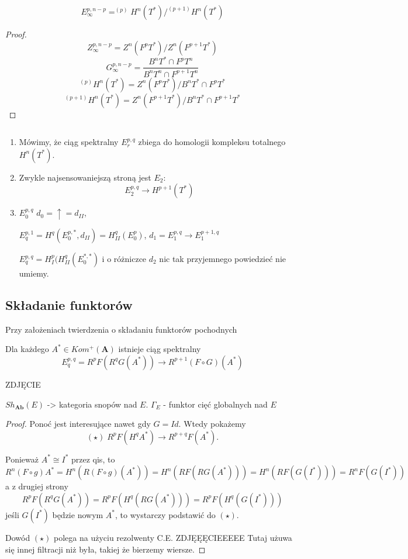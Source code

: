 \begin{fact}
  $$E_\infty^{p,n-p}=^{(p)}H^n(T^*)/^{(p+1)}H^n(T^*)$$
\end{fact}

\begin{proof}
  $$Z_\infty ^{p,n-p}=Z^n(F^pT^*)/Z^n(F^{p+1}T^*)$$
  $$G_\infty^{p, n-p}=\frac{B^nT^*\cap F^pT^n}{B^nT^n\cap F^{p+1}T^n}$$
  $$^{(p)}H^n(T^*)=Z^n(F^pT^*)/B^nT^*\cap F^{p}T^*$$
  $$^{(p+1)}H^n(T^*)=Z^n(F^{p+1}T^*)/B^nT^*\cap F^{p+1}T^*$$
\end{proof}

\begin{uwaga}$ $

  \begin{enumerate}
    \item Mówimy, że ciąg spektralny $E_r^{p,q}$ zbiega do homologii kompleksu totalnego $H^n(T^*)$.
    \item Zwykle najsensowaniejszą stroną jest $E_2$:
      $$E_2^{p,q}\to H^{p+1}(T^*)$$
    \item $E_0^{p,q}$ $d_0=\uparrow=d_{II}$,

      $E_q^{p,1}=H^q(E_0^{p, *}, d_{II})=H_{II}^q(E_0^p)$, $d_1=E_1^{p,q}\to E_1^{p+1, q}$
      
      $E_q^{p,q}=H_I^p(H_{II}^q(E_0^{*,*})$ i o różniczce $d_2$ nic tak przyjemnego powiedzieć nie umiemy.
  \end{enumerate}
\end{uwaga}

\subsection{Składanie funktorów}

\begin{theorem}
  Przy założeniach twierdzenia o składaniu funktorów pochodnych

  Dla każdego $A^*\in Kom^+(\mathbf{A})$ istnieje ciąg spektralny
  $$E_q^{p,q}=R^pF(R^qG(A^*))\to R^{p+1}(F\circ G)(A^*)$$
\end{theorem}

\begin{example}
\item {\large\color{red}ZDJĘCIE}

  $Sh_{\mathbf{Ab}}(E)$ -> kategoria snopów nad $E$. $\Gamma_E$ - funktor cięć globalnych nad $E$
\end{example}

\begin{proof}
  Ponoć jest interesujące nawet gdy $G=Id$. Wtedy pokażemy 
  $$(\star) \; R^pF(H^qA^*)\to R^{p+q}F(A^*).$$

  Ponieważ $A^*\cong I^*$ przez qis, to
  $$R^n(F\circ g)A^*=H^n(R(F\circ g)(A^*))=H^n(RF(RG(A^*)))=H^n(RF(G(I^*)))=R^nF(G(I^*))$$
  a z drugiej strony
  $$R^pF(R^qG(A^*))=R^pF(H^q(RG(A^*)))=R^pF(H^q(G(I^*)))$$
  jeśli $G(I^*)$ będzie nowym $A^*$, to wystarczy podstawić do $(\star)$.

  Dowód $(\star)$ polega na użyciu rezolwenty C.E. {\large\color{red}ZDJĘĘĘCIEEEEE} Tutaj użuwa się innej filtracji niż była, takiej że bierzemy wiersze.

\end{proof}
